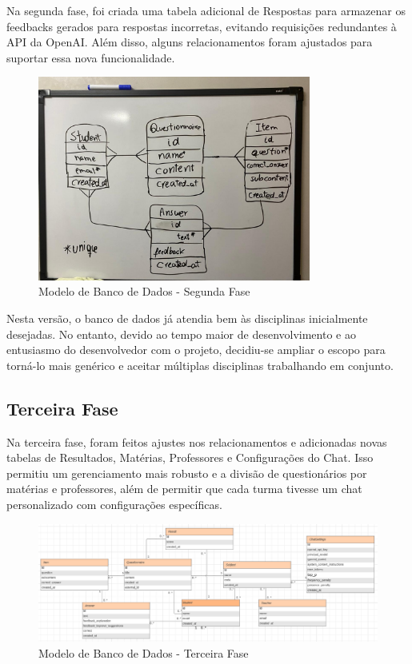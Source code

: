 Na segunda fase, foi criada uma tabela adicional de Respostas para armazenar os feedbacks gerados para respostas incorretas, evitando requisições redundantes à API da OpenAI. Além disso, alguns relacionamentos foram ajustados para suportar essa nova funcionalidade.

\begin{figure}[H]
    \centering
    \includegraphics[width=0.8\textwidth]{figuras/bd-phase2.jpeg}
    \caption{Modelo de Banco de Dados - Segunda Fase}
    \label{fig:second_phase}
\end{figure}

Nesta versão, o banco de dados já atendia bem às disciplinas inicialmente desejadas. No entanto, devido ao tempo maior de desenvolvimento e ao entusiasmo do desenvolvedor com o projeto, decidiu-se ampliar o escopo para torná-lo mais genérico e aceitar múltiplas disciplinas trabalhando em conjunto.

\subsection{Terceira Fase}

Na terceira fase, foram feitos ajustes nos relacionamentos e adicionadas novas tabelas de Resultados, Matérias, Professores e Configurações do Chat. Isso permitiu um gerenciamento mais robusto e a divisão de questionários por matérias e professores, além de permitir que cada turma tivesse um chat personalizado com configurações específicas.

\begin{figure}[H]
    \centering
    \includegraphics[width=1\textwidth]{figuras/bd-phase3.png}
    \caption{Modelo de Banco de Dados - Terceira Fase}
    \label{fig:third_phase}
\end{figure}

